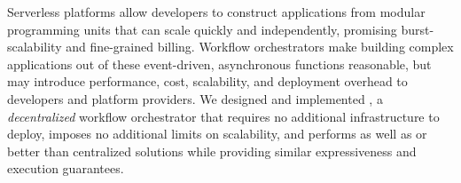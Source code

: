 Serverless platforms allow developers to construct applications from modular
programming units that can scale quickly and independently, promising
burst-scalability and fine-grained billing. Workflow orchestrators make building
complex applications out of these event-driven, asynchronous functions
reasonable, but may introduce performance, cost, scalability, and deployment
overhead to developers and platform providers. We designed and implemented
\name{}, a \emph{decentralized} workflow orchestrator that requires no
additional infrastructure to deploy, imposes no additional limits on
scalability, and performs as well as or better than centralized solutions while
providing similar expressiveness and execution guarantees.
